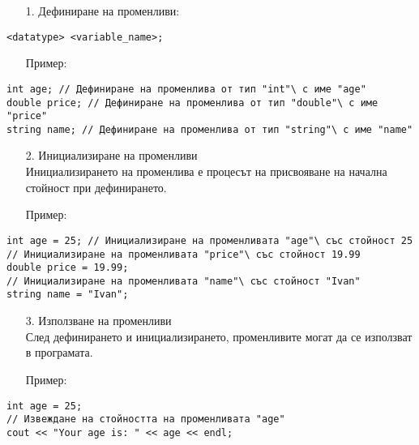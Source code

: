 \documentclass[oneside]{book}
\begin{document}
\begin{enumerate}
    \item[1.] Дефиниране на променливи:
\end{enumerate}
\begin{mdframed}\begin{lstlisting}
<datatype> <variable_name>;
\end{lstlisting}\end{mdframed}
\begin{itemize}
    \item[Пример:] 
\end{itemize}
\begin{mdframed}\begin{lstlisting}
int age; // Дефиниране на променлива от тип "int"\ с име "age"
double price; // Дефиниране на променлива от тип "double"\ с име "price"
string name; // Дефиниране на променлива от тип "string"\ с име "name"
\end{lstlisting}\end{mdframed}
\begin{enumerate}
    \item [2.] Инициализиране на променливи\\Инициализирането на променлива е процесът на присвояване на начална стойност при дефинирането.
\end{enumerate}
\begin{itemize}
    \item[Пример:]
\end{itemize}
\begin{mdframed}\begin{lstlisting}
int age = 25; // Инициализиране на променливата "age"\ със стойност 25
// Инициализиране на променливата "price"\ със стойност 19.99
double price = 19.99;
// Инициализиране на променливата "name"\ със стойност "Ivan"
string name = "Ivan";
\end{lstlisting}\end{mdframed}
\begin{enumerate}
    \item[3.] Използване на променливи\\След дефинирането и инициализирането, променливите могат да се използват в програмата.
\end{enumerate}
\begin{itemize}
    \item[Пример:]
\end{itemize}
\begin{mdframed}\begin{lstlisting}
int age = 25;
// Извеждане на стойността на променливата "age"
cout << "Your age is: " << age << endl;
\end{lstlisting}\end{mdframed}
\end{document}
